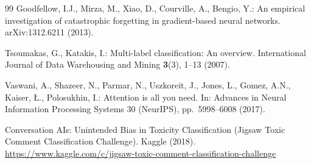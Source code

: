 \documentclass[runningheads]{llncs}
\begin{document}
\begin{thebibliography}{99}
Goodfellow, I.J., Mirza, M., Xiao, D., Courville, A., Bengio, Y.: An empirical investigation of catastrophic forgetting in gradient-based neural networks. arXiv:1312.6211 (2013).

Tsoumakas, G., Katakis, I.: Multi-label classification: An overview. International Journal of Data Warehousing and Mining \textbf{3}(3), 1--13 (2007).

Vaswani, A., Shazeer, N., Parmar, N., Uszkoreit, J., Jones, L., Gomez, A.N., Kaiser, \L., Polosukhin, I.: Attention is all you need. In: Advances in Neural Information Processing Systems 30 (NeurIPS), pp.~5998--6008 (2017).

Conversation AIs: Unintended Bias in Toxicity Classification (Jigsaw Toxic Comment Classification Challenge). Kaggle (2018). \url{https://www.kaggle.com/c/jigsaw-toxic-comment-classification-challenge}

\end{thebibliography}
\end{document}

